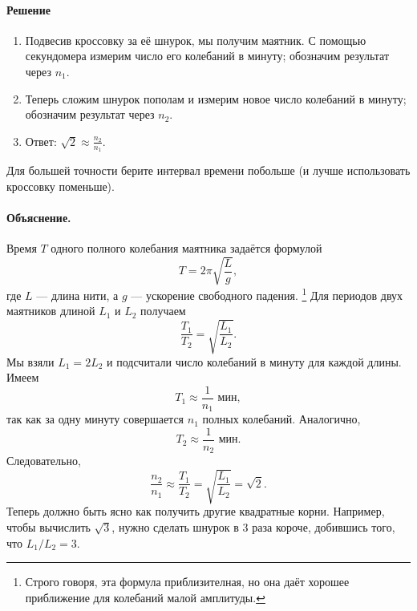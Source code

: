 \paragraph{Решение}

\begin{enumerate}
\item Подвесив кроссовку за её шнурок, мы получим маятник.
С помощью секундомера измерим число его колебаний в минуту;
обозначим результат через $n_1$.

\item Теперь сложим шнурок пополам и измерим новое число колебаний в минуту; обозначим результат через $n_{2}$.

\item Ответ: $\sqrt{2} \approx \frac{n_{2}}{n_{1}}$.
\end{enumerate}
Для большей точности берите интервал времени побольше
(и лучше использовать кроссовку поменьше).

\paragraph{Объяснение.}
Время $T$ одного полного колебания маятника задаётся формулой
\[
T=2\pi \sqrt{\frac{L}{g}},
\]
где $L$ --- длина нити, а $g$ --- ускорение свободного падения.%
\footnote{Строго говоря, эта формула приблизителная, но она даёт хорошее приближение для колебаний малой амплитуды.}
Для периодов двух маятников длиной $L_{1}$ и $L_{2}$ получаем
\[
\frac{T_{1}}{T_{2}}=\sqrt{\frac{L_{1}}{L_{2}}}.
\]
Мы взяли $L_{1}=2L_{2}$ и подсчитали число колебаний в минуту для каждой длины. Имеем
\[
T_{1} \approx \frac{1}{n_{1}}  \text{ мин},
\]
так как за одну минуту совершается $n_{1}$ полных колебаний. Аналогично,
\[
T_{2} \approx \frac{1}{n_{2}}  \text{ мин}.
\]
Следовательно,
\[
\frac{n_{2}}{n_{1}}
\approx
\frac{T_{1}}{T_{2}}
=
\sqrt{\frac{L_{1}}{L_{2}}}
=\sqrt{2}.
\]
Теперь должно быть ясно как получить другие квадратные корни.
Например, чтобы вычислить $\sqrt{3}$, нужно сделать шнурок в 3 раза короче, добившись того, что $L_{1}/L_{2}=3$.
